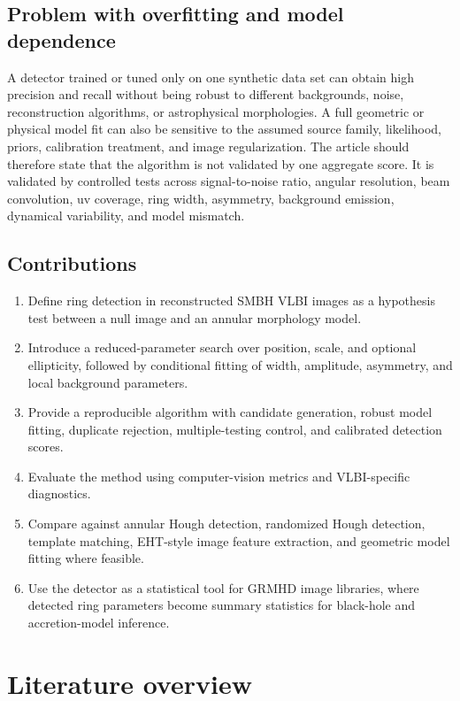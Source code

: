 \documentclass[11pt]{article}
\begin{document}
\subsection{Problem with overfitting and model dependence}
A detector trained or tuned only on one synthetic data set can obtain high precision and recall without being robust to different backgrounds, noise, reconstruction algorithms, or astrophysical morphologies. A full geometric or physical model fit can also be sensitive to the assumed source family, likelihood, priors, calibration treatment, and image regularization. The article should therefore state that the algorithm is not validated by one aggregate score. It is validated by controlled tests across signal-to-noise ratio, angular resolution, beam convolution, uv coverage, ring width, asymmetry, background emission, dynamical variability, and model mismatch.

\subsection{Contributions}
\begin{enumerate}[leftmargin=*]
    \item Define ring detection in reconstructed SMBH VLBI images as a hypothesis test between a null image and an annular morphology model.
    \item Introduce a reduced-parameter search over position, scale, and optional ellipticity, followed by conditional fitting of width, amplitude, asymmetry, and local background parameters.
    \item Provide a reproducible algorithm with candidate generation, robust model fitting, duplicate rejection, multiple-testing control, and calibrated detection scores.
    \item Evaluate the method using computer-vision metrics and VLBI-specific diagnostics.
    \item Compare against annular Hough detection, randomized Hough detection, template matching, EHT-style image feature extraction, and geometric model fitting where feasible.
    \item Use the detector as a statistical tool for GRMHD image libraries, where detected ring parameters become summary statistics for black-hole and accretion-model inference.
\end{enumerate}

\section{Literature overview}
\end{document}
